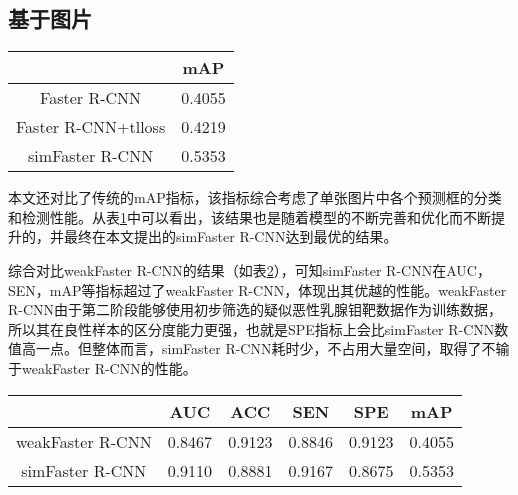\subsection{基于图片}
\begin{table}[!htbp]
    \label{tab:1_stage_pred_result_based_on_image}
    \centering
    \footnotesize%
    \setlength{\tabcolsep}{4pt}%
    \renewcommand{\arraystretch}{1.2}%
    \begin{tabular}{cc}
        \hline
        &mAP\\
        \hline
        Faster R-CNN& 0.4055\\
        Faster R-CNN+tlloss& 0.4219\\
        simFaster R-CNN& 0.5353\\
        \hline
    \end{tabular}
\end{table}
本文还对比了传统的mAP指标，该指标综合考虑了单张图片中各个预测框的分类和检测性能。从表\ref{tab:1_stage_pred_result_based_on_image}中可以看出，该结果也是随着模型的不断完善和优化而不断提升的，并最终在本文提出的simFaster R-CNN达到最优的结果。

综合对比weakFaster R-CNN的结果（如表\ref{tab:2_stage_2_pred_result}），可知simFaster R-CNN在AUC，SEN，mAP等指标超过了weakFaster R-CNN，体现出其优越的性能。weakFaster R-CNN由于第二阶段能够使用初步筛选的疑似恶性乳腺钼靶数据作为训练数据，所以其在良性样本的区分度能力更强，也就是SPE指标上会比simFaster R-CNN数值高一点。但整体而言，simFaster R-CNN耗时少，不占用大量空间，取得了不输于weakFaster R-CNN的性能。
\begin{table}[!htbp]
    \label{tab:2_stage_2_pred_result}
    \centering
    \footnotesize%
    \setlength{\tabcolsep}{4pt}%
    \renewcommand{\arraystretch}{1.2}%
    \begin{tabular}{cccccc}
        \hline
        &AUC& ACC &SEN &SPE &mAP\\
        \hline
        weakFaster R-CNN& 0.8467 &0.9123 &0.8846 &0.9123 &0.4055\\
        simFaster R-CNN& 0.9110 &0.8881 &0.9167 &0.8675 &0.5353\\
        \hline
    \end{tabular}
\end{table}

